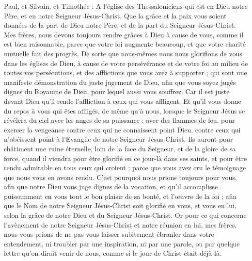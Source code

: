 \begin{multicols}{2}
\VerseOne{}Paul, et Silvain, et Timothée : A l'église des Thessaloniciens qui est en Dieu notre Père, et en notre Seigneur Jésus-Christ.
Que la grâce et la paix vous soient données de la part de Dieu notre Père, et de la part du Seigneur Jésus-Christ.
Mes frères, nous devons toujours rendre grâces à Dieu à cause de vous, comme il est bien raisonnable, parce que votre foi augmente beaucoup, et que votre charité mutuelle fait des progrès.
De sorte que nous-mêmes nous nous glorifions de vous dans les églises de Dieu, à cause de votre persévérance et de votre foi au milieu de toutes vos persécutions, et des afflictions que vous avez à supporter ;
qui sont une manifeste démonstration du juste jugement de Dieu, afin que vous soyez jugés dignes du Royaume de Dieu, pour lequel aussi vous souffrez.
Car il est juste devant Dieu qu'il rende l'affliction à ceux qui vous affligent.
Et qu'il vous donne du repos à vous qui êtes affligés, de même qu'à nous, lorsque le Seigneur Jésus se révélera du ciel avec les anges de sa puissance ;
avec des flammes de feu, pour exercer la vengeance contre ceux qui ne connaissent point Dieu, contre ceux qui n'obéissent point à l'Evangile de notre Seigneur Jésus-Christ.
Ils auront pour châtiment une ruine éternelle, loin de la face du Seigneur, et de la gloire de sa force,
quand il viendra pour être glorifié en ce jour-là dans ses saints, et pour être rendu admirable en tous ceux qui croient ; parce que vous avez cru le témoignage que nous vous en avons rendu.
C'est pourquoi nous prions toujours pour vous, afin que notre Dieu vous juge dignes de la vocation, et qu'il accomplisse puissamment en vous tout le bon plaisir de sa bonté, et l'œuvre de la foi ;
afin que le Nom de notre Seigneur Jésus-Christ soit glorifié en vous, et vous en lui, selon la grâce de notre Dieu et du Seigneur Jésus-Christ.
\VerseOne{}Or pour ce qui concerne l'avènement de notre Seigneur Jésus-Christ et notre réunion en lui, mes frères, nous vous prions
de ne pas vous laisser subitement ébranler dans votre entendement, ni troubler par une inspiration, ni par une parole, ou par quelque lettre qu'on dirait venir de nous, comme si le jour de Christ était déjà là.

\end{multicols}
